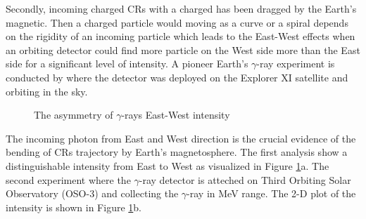 Secondly, incoming charged CRs with a charged has been dragged 
by the Earth's magnetic. Then a charged particle would moving as 
a curve or a spiral depends on the rigidity of an incoming particle
which leads to the East-West effects when an orbiting detector could 
find more particle on the West side more than the East side for 
a significant level of intensity. A pioneer Earth's $\gamma$-ray 
experiment is conducted by \cite{kraushaar1965explorer} where the 
detector was deployed on the Explorer XI satellite and orbiting in the sky.


\begin{figure}[h!]
    \centering
        \hfill
        \caption{
            The asymmetry of $\gamma$-rays East-West intensity 
        }
       \label{fig:gamma_ew}
\end{figure}
The incoming photon from East and West direction is the crucial evidence 
of the bending of CRs trajectory by Earth's magnetosphere. The first 
analysis show a distinguishable intensity from East to West as visualized 
in Figure \ref{fig:gamma_ew}a. The second experiment where
the $\gamma$-ray detector is atteched on Third Orbiting Solar
Observatory (OSO-3) and collecting the $\gamma$-ray in MeV range.
The 2-D plot of the intensity is shown in Figure \ref{fig:gamma_ew}b.

